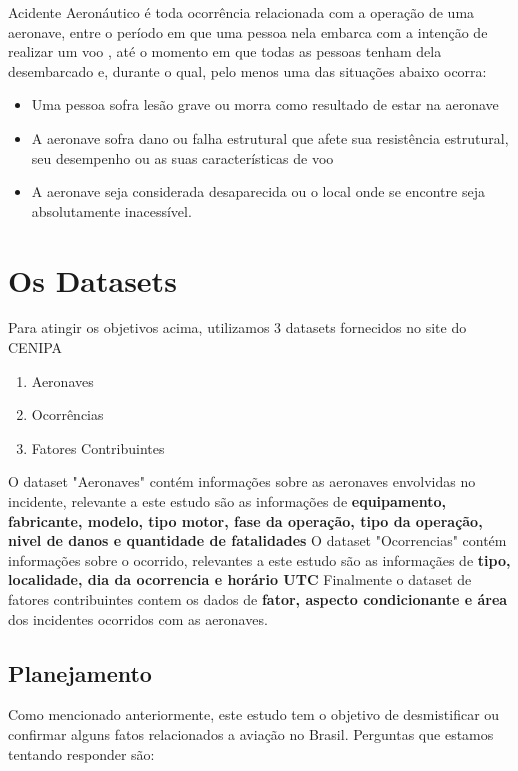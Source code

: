 \documentclass[conference]{IEEEtran}
\begin{document}
Acidente Aeronáutico é toda ocorrência relacionada com a operação de uma aeronave, entre o período em que uma pessoa nela embarca com a intenção de realizar um voo
, até o momento em que todas as pessoas tenham dela desembarcado e, durante o qual, pelo menos uma das situações abaixo ocorra: \\

\begin{itemize}
 \item Uma pessoa sofra lesão grave ou morra como resultado de estar na aeronave
 \item A aeronave sofra dano ou falha estrutural que afete sua resistência estrutural, seu desempenho ou as suas características de voo
 \item A aeronave seja considerada desaparecida ou o local onde se encontre seja absolutamente inacessível.
\end{itemize}

\section{Os Datasets}

Para atingir os objetivos acima, utilizamos 3 datasets fornecidos no site do CENIPA

\begin{enumerate}
 \item Aeronaves
 \item Ocorrências
 \item Fatores Contribuintes
\end{enumerate}

O dataset "Aeronaves" contém informações sobre as aeronaves envolvidas no incidente, relevante a este estudo são as informações de \textbf{equipamento, fabricante, modelo, 
tipo motor, fase da operação, tipo da operação, nivel de danos e quantidade de fatalidades}
O dataset "Ocorrencias" contém informações sobre o ocorrido, relevantes a este estudo são as informaçães de \textbf{ tipo, localidade, dia da ocorrencia e horário UTC  }
Finalmente o dataset de fatores contribuintes contem os dados de \textbf{ fator, aspecto condicionante e área } dos incidentes ocorridos com as aeronaves.

\subsection{Planejamento}

Como mencionado anteriormente, este estudo tem o objetivo de desmistificar ou confirmar alguns fatos relacionados a aviação no Brasil. Perguntas que estamos tentando
responder são: 
\end{document}
